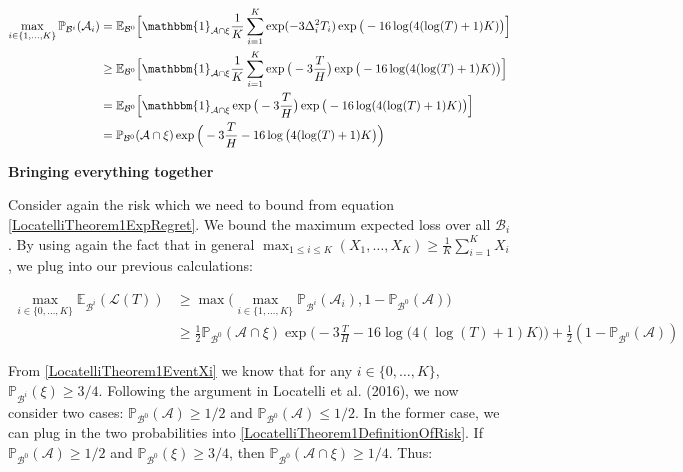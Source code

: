 \documentclass[11pt,]{article}
\begin{document}
\begin{align*}
\max_{i \in \{1,\dots,K\}} \mathbb{P}_{\mathcal{B}^i}(\mathcal{A}_i) & = \mathbb{E}_{\mathcal{B}^0} \Big[\mathbbm{1}_{\mathcal{A} \cap \xi} \frac{1}{K} \sum_{i=1}^{K} \exp (- 3 \Delta_i^2 T_i) \exp \big(-16 \log(4(\log(T)+1)K)\big) \Big] \\
& \geq \mathbb{E}_{\mathcal{B}^0} \Big[\mathbbm{1}_{\mathcal{A} \cap \xi} \frac{1}{K} \sum_{i=1}^{K} \exp \big(- 3 \frac{T}{H}\big) \exp \big(-16 \log(4(\log(T)+1)K)\big) \Big] \\
& = \mathbb{E}_{\mathcal{B}^0} \Big[\mathbbm{1}_{\mathcal{A} \cap \xi} \exp \big(- 3 \frac{T}{H}\big) \exp \big(-16 \log(4(\log(T)+1)K)\big) \Big] \\
& = \mathbb{P}_{\mathcal{B}^0} (\mathcal{A} \cap \xi) \exp \Big(- 3 \frac{T}{H} -16 \log \big(4(\log(T)+1)K\big)\Big)
\end{align*}

\textbf{Bringing everything together}

Consider again the risk which we need to bound from equation
\eqref{LocatelliTheorem1ExpRegret}. We bound the maximum expected loss
over all \(\mathcal{B}_i\). By using again the fact that in general
\(\max_{1 \leq i \leq K} (X_1, \dots, X_K) \geq \frac{1}{K} \sum_{i = 1}^K X_i\),
we plug into our previous calculations:

\begin{align}
\max_{i \in \{0, \dots, K\}} \mathbb{E}_{\mathcal{B}^i} (\mathcal{L}(T)) & \geq \max \big( \max_{i \in \{1, \dots, K\}} \mathbb{P}_{\mathcal{B}^i}(\mathcal{A}_i), 1 - \mathbb{P}_{\mathcal{B}^0}(\mathcal{A}) \big) \\
& \geq \frac{1}{2}\mathbb{P}_{\mathcal{B}^0} (\mathcal{A} \cap \xi) \exp \Big(- 3 \frac{T}{H} -16 \log \big(4(\log(T)+1)K\big)\Big) + \frac{1}{2}(1 - \mathbb{P}_{\mathcal{B}^0}(\mathcal{A})) \label{LocatelliTheorem1DefinitionOfRisk}
\end{align}

From \eqref{LocatelliTheorem1EventXi} we know that for any
\(i \in \{0, \dots, K\}\), \(\mathbb{P}_{\mathcal{B}^i}(\xi) \geq 3/4\).
Following the argument in Locatelli et al. (2016), we now consider two
cases: \(\mathbb{P}_{\mathcal{B}^0}(\mathcal{A}) \geq 1/2\) and
\(\mathbb{P}_{\mathcal{B}^0}(\mathcal{A}) \leq 1/2\). In the former
case, we can plug in the two probabilities into
\eqref{LocatelliTheorem1DefinitionOfRisk}. If
\(\mathbb{P}_{\mathcal{B}^0}(\mathcal{A}) \geq 1/2\) and
\(\mathbb{P}_{\mathcal{B}^0}(\xi) \geq 3/4\), then
\(\mathbb{P}_{\mathcal{B}^0}(\mathcal{A} \cap \xi) \geq 1/4\). Thus:
\end{document}
